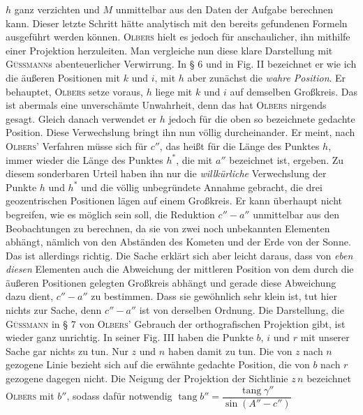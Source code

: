$h$ ganz verzichten und $M$ unmittelbar aus den Daten der Aufgabe berechnen kann. Dieser letzte Schritt hätte analytisch mit den bereits gefundenen Formeln ausgeführt werden können. \textsc{Olbers} hielt es jedoch für anschaulicher, ihn mithilfe einer Projektion herzuleiten. Man vergleiche nun diese klare Darstellung mit \textsc{Güssmann}s abenteuerlicher Verwirrung. In § 6 und in Fig. II bezeichnet er wie ich die äußeren Positionen mit $k$ und $i$, mit $h$ aber zunächst die \emph{wahre Position}. Er behauptet, \textsc{Olbers} setze voraus, $h$ liege mit $k$ und $i$ auf demselben Großkreis. Das ist abermals eine unverschämte Unwahrheit, denn das hat \textsc{Olbers} nirgends gesagt. Gleich danach verwendet er $h$ jedoch für die oben so bezeichnete gedachte Position. Diese Verwechslung bringt ihn nun völlig durcheinander. Er meint, nach \textsc{Olbers}’ Verfahren müsse sich für $c''$, das heißt für die Länge des Punktes $h$, immer wieder die Länge des Punktes $h^*$, die mit $a''$ bezeichnet ist, ergeben. Zu diesem sonderbaren Urteil haben ihn nur die \emph{willkürliche} Verwechslung der Punkte $h$ und $h^*$ und die völlig unbegründete Annahme gebracht, die drei geozentrischen Positionen lägen auf einem Großkreis. Er kann überhaupt nicht begreifen, wie es möglich sein soll, die Reduktion $c''-a''$ unmittelbar aus den Beobachtungen zu berechnen, da sie von zwei noch unbekannten Elementen abhängt, nämlich von den Abständen des Kometen und der Erde von der Sonne. Das ist allerdings richtig. Die Sache erklärt sich aber leicht daraus, dass von \emph{eben diesen} Elementen auch die Abweichung der mittleren Position von dem durch die äußeren Positionen gelegten Großkreis abhängt und gerade diese Abweichung dazu dient, $c''-a''$ zu bestimmen. Dass sie gewöhnlich sehr klein ist, tut hier nichts zur Sache, denn $c''-a''$ ist von derselben Ordnung. Die Darstellung, die \textsc{Güssmann} in § 7 von \textsc{Olbers}’ Gebrauch der orthografischen Projektion gibt, ist wieder ganz unrichtig. In seiner Fig. III haben die Punkte $b$, $i$ und $r$ mit unserer Sache gar nichts zu tun. Nur $z$ und $n$ haben damit zu tun. Die von $z$ nach $n$ gezogene Linie bezieht sich auf die erwähnte gedachte Position, die von $b$ nach $r$ gezogene dagegen nicht. Die Neigung der Projektion der Sichtlinie $z\,n$ bezeichnet \textsc{Olbers} mit $b''$, sodass dafür notwendig
$\operatorname{tang} b'' = \dfrac{\operatorname{tang} \gamma''}{\sin(A''-c'')}$
